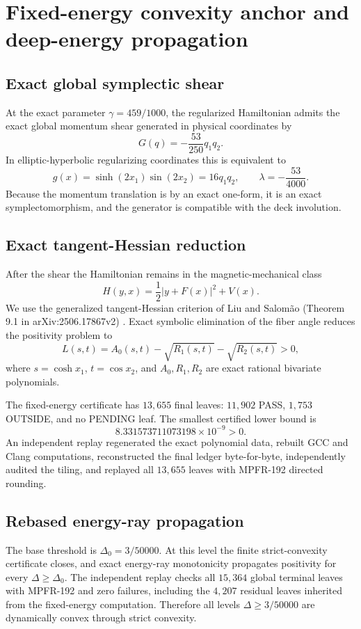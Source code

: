 \documentclass[11pt]{article}
\begin{document}
\section{Fixed-energy convexity anchor and deep-energy propagation}
\subsection{Exact global symplectic shear}
At the exact parameter $\gamma=459/1000$, the regularized Hamiltonian admits the exact global momentum shear generated in physical coordinates by
\[
G(q)=-\frac{53}{250}q_1q_2.
\]
In elliptic-hyperbolic regularizing coordinates this is equivalent to
\[
g(x)=\sinh(2x_1)\sin(2x_2)=16q_1q_2,
\qquad \lambda=-\frac{53}{4000}.
\]
Because the momentum translation is by an exact one-form, it is an exact symplectomorphism, and the generator is compatible with the deck involution.

\subsection{Exact tangent-Hessian reduction}
After the shear the Hamiltonian remains in the magnetic-mechanical class
\[
H(y,x)=\frac12\lvert y+F(x)\rvert^2+V(x).
\]
We use the generalized tangent-Hessian criterion of Liu and Salom\~ao (Theorem 9.1 in arXiv:2506.17867v2) \citep{LiuSalomao2025}. Exact symbolic elimination of the fiber angle reduces the positivity problem to
\[
L(s,t)=A_0(s,t)-\sqrt{R_1(s,t)}-\sqrt{R_2(s,t)}>0,
\]
where $s=\cosh x_1$, $t=\cos x_2$, and $A_0,R_1,R_2$ are exact rational bivariate polynomials.

The fixed-energy certificate has $13{,}655$ final leaves: $11{,}902$ PASS, $1{,}753$ OUTSIDE, and no PENDING leaf. The smallest certified lower bound is
\[
8.331573711073198\times 10^{-9}>0.
\]
An independent replay regenerated the exact polynomial data, rebuilt GCC and Clang computations, reconstructed the final ledger byte-for-byte, independently audited the tiling, and replayed all $13{,}655$ leaves with MPFR-192 directed rounding.

\subsection{Rebased energy-ray propagation}
The base threshold is $\Delta_0=3/50000$. At this level the finite strict-convexity certificate closes, and exact energy-ray monotonicity propagates positivity for every $\Delta\ge\Delta_0$. The independent replay checks all $15{,}364$ global terminal leaves with MPFR-192 and zero failures, including the $4{,}207$ residual leaves inherited from the fixed-energy computation. Therefore all levels $\Delta\ge3/50000$ are dynamically convex through strict convexity.
\end{document}
